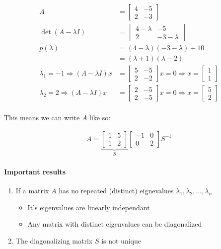 \begin{align*}
  A &= 
  \begin{bmatrix}
    4 & -5 \\ 2 & -3
  \end{bmatrix} \\
  \det(A-\lambda I) &= 
  \begin{vmatrix}
    4 - \lambda  & -5 \\ 2 & -3 - \lambda
  \end{vmatrix} \\
  p(\lambda) &= (4- \lambda)(-3 - \lambda) +10 \\
  &= (\lambda +  1)(\lambda - 2)\\
  \lambda_1 = -1 \Rightarrow (A - \lambda I)x &=
  \begin{bmatrix}
    5 & -5 \\ 2 & -2
  \end{bmatrix} x
  =0 \Rightarrow x = 
  \begin{bmatrix}
    1 \\ 1
  \end{bmatrix} \\
  \lambda_2 = 2 \Rightarrow (A - \lambda I)x &=
  \begin{bmatrix}
    2 & -5 \\ 2 & -5
  \end{bmatrix} x
  =0 \Rightarrow x = 
  \begin{bmatrix}
    5 \\ 2
  \end{bmatrix} \\
\end{align*}

This means we can write $A$ like so:

\begin{align*}
  A =
  \underbrace{
    \begin{bmatrix}
      1 & 5 \\ 1 & 2
    \end{bmatrix}
  }_S
  \begin{bmatrix}
    -1 & 0 \\ 0 & 2
  \end{bmatrix}
  S^{-1}
\end{align*}

\paragraph{Important results}
\begin{enumerate}
  \item If a matrix $A$ has no repeated (distinct) eignevalues $\lambda_1, \lambda_2, \dots, \lambda_n$
  \begin{itemize}
    \item It's eigenvalues are linearly independant
    \item Any matrix with distinct eigenvalues can be diagonalized
  \end{itemize}
  \item The diagonalizing matrix $S$ is not unique
\end{enumerate}

